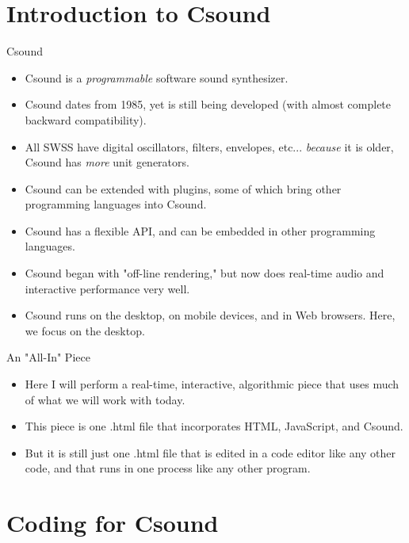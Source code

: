 \documentclass{beamer}
\begin{document}
    \section{Introduction to Csound}
    \begin{frame}{Csound}
        \begin{itemize}
            \item Csound is a \textit{programmable} software sound synthesizer.
            \item Csound dates from 1985, yet is still being developed (with almost
            complete backward compatibility).
            \item All SWSS have digital oscillators, filters, envelopes, etc...
            \textit{because} it is older, Csound has \textit{more} unit generators.
            \item Csound can be extended with plugins, some of which bring other
            programming languages into Csound. 
            \item Csound has a flexible API, and can be embedded in other
            programming languages.
            \item Csound began with "off-line rendering," but now does real-time
            audio and interactive performance very well.
            \item Csound runs on the desktop, on mobile devices, and in Web
            browsers. Here, we focus on the desktop. 
        \end{itemize}
    \end{frame}
    \begin{frame}{An "All-In" Piece}
        \begin{itemize}
            \item Here I will perform a real-time, interactive, algorithmic piece
            that uses much of what we will work with today.
            \item This piece is one .html file that incorporates  HTML, JavaScript, and Csound.
            \item But it is still just one .html file that is edited in a code editor
            like any other code, and that runs in one process like any other program.
        \end{itemize}
    \end{frame}
    
    \section{Coding for Csound}
    
\end{document}
